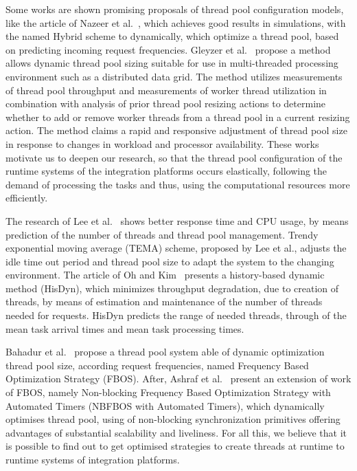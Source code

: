 Some works are shown promising proposals of thread pool configuration models, like the article of Nazeer et al.~\cite{nazeer2016}, which achieves good results in simulations, with the named Hybrid scheme to dynamically, which optimize a thread pool, based on predicting incoming request frequencies. Gleyzer et al.~\cite{gleyzer2017} propose a method allows dynamic thread pool sizing suitable for use in multi-threaded processing environment such as a distributed data grid. The method utilizes measurements of thread pool throughput and measurements of worker thread utilization in combination with analysis of prior thread pool resizing actions to determine whether to add or remove worker threads from a thread pool in a current resizing action. The method claims a rapid and responsive adjustment of thread pool size in response to changes in workload and processor availability. These works motivate us to deepen our research, so that the thread pool configuration of the runtime systems of the integration platforms occurs elastically, following the demand of processing the tasks and thus, using the computational resources more efficiently.

The research of Lee et al.~\cite{lee2011} shows better response time and CPU usage, by means prediction of the number of threads and thread pool management. Trendy exponential moving average (TEMA) scheme, proposed by Lee et al., adjusts the idle time out period and thread pool size to adapt the system to the changing environment. The article of Oh and Kim~\cite{oh2013} presents a history-based dynamic method (HisDyn), which minimizes throughput degradation, due to creation of threads, by means of estimation and maintenance of the number of threads needed for requests. HisDyn predicts the range of needed threads, through of the mean task arrival times and mean task processing times.

Bahadur et al.~\cite{bahadur2014} propose a thread pool system able of dynamic optimization thread pool size, according request frequencies, named Frequency Based Optimization Strategy (FBOS). After, Ashraf et al.~\cite{ashraf2016} present an extension of work of FBOS, namely Non-blocking Frequency Based Optimization Strategy with Automated Timers (NBFBOS with Automated Timers), which dynamically optimises thread pool, using of non-blocking synchronization primitives offering advantages of substantial scalability and liveliness. For all this, we believe that it is possible to find out to get optimised strategies to create threads at runtime to runtime systems of integration platforms.

